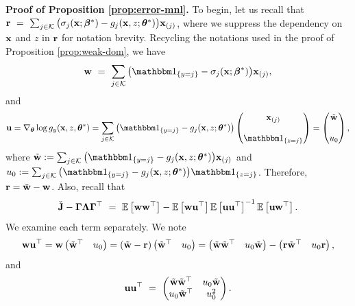 \noindent
\textbf{Proof of Proposition \ref{prop:error-mnl}.}
To begin, let us recall that $
\mathbf{r} ~=~ \sum_{j\in \mathcal{K}}\big(\sigma_{j}(\mathbf{x}; \bm{\beta}^*) 
 - g_{j}(\mathbf{x}, z; \bm{\theta}^*)\big)\mathbf{x}_{(j)}
$, where we suppress the dependency on $\mathbf{x}$ and $z$ in $\mathbf{r}$ for notation brevity. 
Recycling the notations used in the proof of Proposition \ref{prop:weak-dom}, we have 
$$\wvec~=~\sum_{j\in \Kscr}\big(\ind_{\{y = j\}} - \sigma_{j}(\x; \betavec^*)\big)\x_{(j)},
$$
and 
$$
\uvec = \nabla_{\thetavec} \log g_y(\x, z, \thetavec^*) = \sum_{j\in \Kscr}\big(\ind_{\{y = j\}} - g_{j}(\x, z; \thetavec^*)\big)\begin{pmatrix}
    \x_{(j)}\\\\\ind_{\{z = j\}}
\end{pmatrix}=
\begin{pmatrix}
    \tilde{\wvec}\\\\u_0
\end{pmatrix},
$$
where $\tilde{\wvec} := \sum_{j\in \Kscr}\big(\ind_{\{y = j\}} - g_{j}(\x, z; \thetavec^*)\big)\x_{(j)}$ and $u_0 :=\sum_{j\in \Kscr}\big(\ind_{\{y = j\}} - g_{j}(\x, z; \thetavec^*)\big)\ind_{\{z = j\}}$.
Therefore, $\mathbf{r} = \tilde{\mathbf{w}} - \mathbf{w}$. 
Also, recall that $$
\check{\mathbf{J}} - \bm{\Gamma}\bm{\Lambda}\bm{\Gamma}^{\top}~=~
\mathbb{E}\left[\mathbf{w} \mathbf{w}^{\top} \right] - \mathbb{E}\left[\mathbf{w} \mathbf{u}^{\top} \right]\mathbb{E}\left[\mathbf{u} \mathbf{u}^{\top} \right]^{-1}\mathbb{E}\left[\mathbf{u} \mathbf{w}^{\top}\right].
$$
We examine each term separately. 
We note 
\begin{align*}
 \mathbf{w} \mathbf{u}^{\top} = \mathbf{w} 
 \begin{pmatrix}
    \tilde{\mathbf{w}}^{\top} & u_0
 \end{pmatrix}
 = (\tilde{\mathbf{w}} - \mathbf{r}) 
 \begin{pmatrix}
    \tilde{\mathbf{w}}^{\top} & u_0
 \end{pmatrix}
 =  \begin{pmatrix}
    \tilde{\mathbf{w}}\tilde{\mathbf{w}}^{\top} & u_0\tilde{\mathbf{w}}   
 \end{pmatrix} - 
 \begin{pmatrix}
    \mathbf{r}\tilde{\mathbf{w}}^{\top} & u_0\mathbf{r}   
 \end{pmatrix},
\end{align*}
and 
$$
\mathbf{u} \mathbf{u}^{\top} ~=~
\begin{pmatrix}
    \tilde{\mathbf{w}}\tilde{\mathbf{w}}^{\top} & u_0\tilde{\mathbf{w}}\\
    u_0\tilde{\mathbf{w}}^{\top} & u_0^2
\end{pmatrix}.
$$
